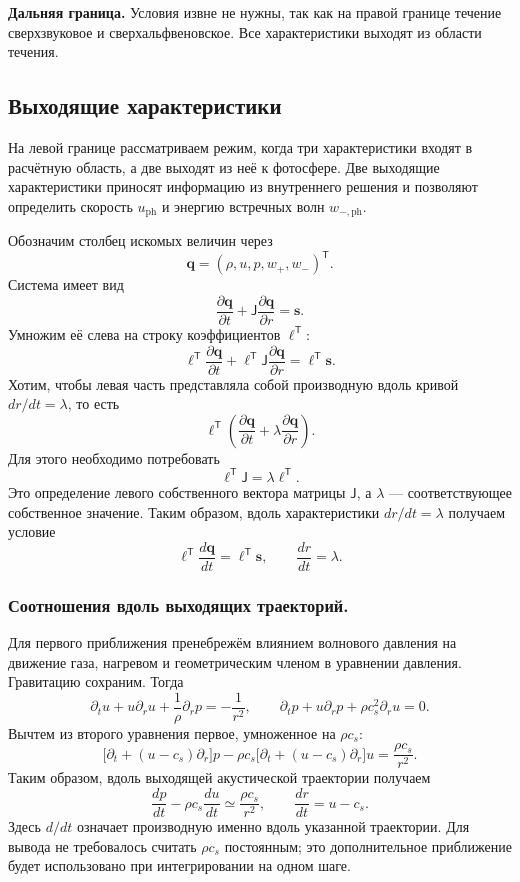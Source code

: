 \documentclass[11pt,a4paper]{article}
\begin{document}
\textbf{Дальняя граница.}
Условия извне не нужны, так как на правой границе течение сверхзвуковое и сверхальфвеновское. Все характеристики выходят из области течения.

\subsection{Выходящие характеристики}

На левой границе рассматриваем режим, когда три характеристики
входят в расчётную область, а две выходят из неё к фотосфере.
Две выходящие характеристики приносят информацию
из внутреннего решения и позволяют определить
скорость $u_{\mathrm{ph}}$ и энергию встречных волн
$w_{-,\mathrm{ph}}$.

Обозначим столбец искомых величин через
\[
 \bm q=(\rho,u,p,w_+,w_-)^{\mathsf T}.
\]
Система имеет вид
\[
\frac{\partial\bm q}{\partial t}
+\mathsf J\frac{\partial\bm q}{\partial r}
=\bm s.
\]
Умножим её слева на строку коэффициентов
$\bm\ell^{\mathsf T}$:
\[
\bm\ell^{\mathsf T}\frac{\partial\bm q}{\partial t}
+\bm\ell^{\mathsf T}\mathsf J
\frac{\partial\bm q}{\partial r}
=\bm\ell^{\mathsf T}\bm s.
\]
Хотим, чтобы левая часть представляла собой производную
вдоль кривой $dr/dt=\lambda$, то есть
\[
\bm\ell^{\mathsf T}
\left(
\frac{\partial\bm q}{\partial t}
+\lambda\frac{\partial\bm q}{\partial r}
\right).
\]
Для этого необходимо потребовать
\[
\boxed{
\bm\ell^{\mathsf T}\mathsf J
=\lambda\bm\ell^{\mathsf T}.
}
\]
Это определение левого собственного вектора матрицы
$\mathsf J$, а $\lambda$ --- соответствующее собственное значение.
Таким образом, вдоль характеристики $dr/dt=\lambda$
получаем условие
\[
\boxed{
\bm\ell^{\mathsf T}\frac{d\bm q}{dt}
=\bm\ell^{\mathsf T}\bm s,
\qquad
\frac{dr}{dt}=\lambda.
}
\]

\subsubsection{Соотношения вдоль выходящих траекторий.}

Для первого приближения пренебрежём влиянием
волнового давления на движение газа, нагревом
и геометрическим членом в уравнении давления.
Гравитацию сохраним.
Тогда
\[
 \partial_tu+u\partial_ru+\frac1\rho\partial_rp
 =-\frac1{r^2},
 \qquad
 \partial_tp+u\partial_rp+\rho c_s^2\partial_ru=0.
\]
Вычтем из второго уравнения первое,
умноженное на $\rho c_s$:
\[
 \bigl[\partial_t+(u-c_s)\partial_r\bigr]p
 -\rho c_s
 \bigl[\partial_t+(u-c_s)\partial_r\bigr]u
 =\frac{\rho c_s}{r^2}.
\]
Таким образом, вдоль выходящей акустической траектории
получаем
\begin{equation}
 \boxed{
 \frac{dp}{dt}-\rho c_s\frac{du}{dt}
 \simeq\frac{\rho c_s}{r^2},
 \qquad
 \frac{dr}{dt}=u-c_s.
 }
 \label{bc:acoustic-path}
\end{equation}
Здесь $d/dt$ означает производную именно вдоль
указанной траектории.
Для вывода не требовалось считать $\rho c_s$
постоянным; это дополнительное приближение
будет использовано при интегрировании на одном шаге.
\end{document}
